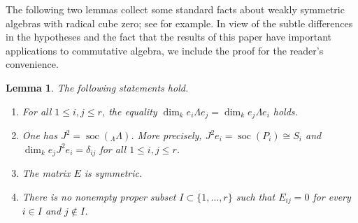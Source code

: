 \documentclass{amsart}
\newtheorem{lem}[thm]{Lemma}
\theoremstyle{definition}
\theoremstyle{remark}
\numberwithin{equation}{thm}
\def\dim{\operatorname{dim}}
\def\L{\Lambda}
\def\le{\leqslant}
\def\soc{\operatorname{soc}}
\begin{document}
The following two lemmas collect some standard facts about weakly symmetric algebras with radical cube zero; see \cite{Ben, E, ESo, Lam} for example.
In view of the subtle differences in the hypotheses and the fact that the results of this paper have important applications to commutative algebra, we include the proof for the reader's convenience.

\begin{lem}\label{basic properties1}
The following statements hold.
\begin{enumerate}[{\rm (1)}]
\item For all $1\le i,j\le r$, the equality $\dim_k e_i\L e_j=\dim_k e_j\L e_i$ holds.
\item One has $J^2=\soc({}_\L\L)$. More precisely, $J^2e_i=\soc(P_i)\cong S_i$ and $\dim_k e_jJ^2e_i=\delta_{ij}$ for all $1\le i,j\le r$.
\item The matrix $E$ is symmetric.
\item There is no nonempty proper subset $I\subset\{1,\ldots,r\}$ such that $E_{ij}=0$ for every $i\in I$ and $j\notin I$.
\end{enumerate}
\end{lem}
\end{document}
